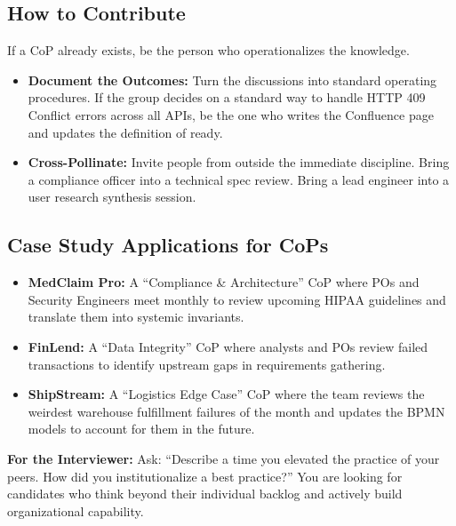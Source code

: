 \documentclass[
  11pt,
  openany,
  oneside]{book}
\providecommand{\tightlist}{%
  \setlength{\itemsep}{0pt}\setlength{\parskip}{0pt}}
\renewenvironment{quote}{\begin{customquote}}{\end{customquote}}
\begin{document}
\subsection{How to Contribute}\label{how-to-contribute}

If a CoP already exists, be the person who operationalizes the
knowledge.

\begin{itemize}
\tightlist
\item
  \textbf{Document the Outcomes:} Turn the discussions into standard
  operating procedures. If the group decides on a standard way to handle
  HTTP 409 Conflict errors across all APIs, be the one who writes the
  Confluence page and updates the definition of ready.
\item
  \textbf{Cross-Pollinate:} Invite people from outside the immediate
  discipline. Bring a compliance officer into a technical spec review.
  Bring a lead engineer into a user research synthesis session.
\end{itemize}

\subsection{Case Study Applications for
CoPs}\label{case-study-applications-for-cops}

\begin{itemize}
\tightlist
\item
  \textbf{MedClaim Pro:} A ``Compliance \& Architecture'' CoP where POs
  and Security Engineers meet monthly to review upcoming HIPAA
  guidelines and translate them into systemic invariants.
\item
  \textbf{FinLend:} A ``Data Integrity'' CoP where analysts and POs
  review failed transactions to identify upstream gaps in requirements
  gathering.
\item
  \textbf{ShipStream:} A ``Logistics Edge Case'' CoP where the team
  reviews the weirdest warehouse fulfillment failures of the month and
  updates the BPMN models to account for them in the future.
\end{itemize}

\begin{quote}
\textbf{For the Interviewer:} Ask: ``Describe a time you elevated the
practice of your peers. How did you institutionalize a best practice?''
You are looking for candidates who think beyond their individual backlog
and actively build organizational capability.
\end{quote}
\end{document}
